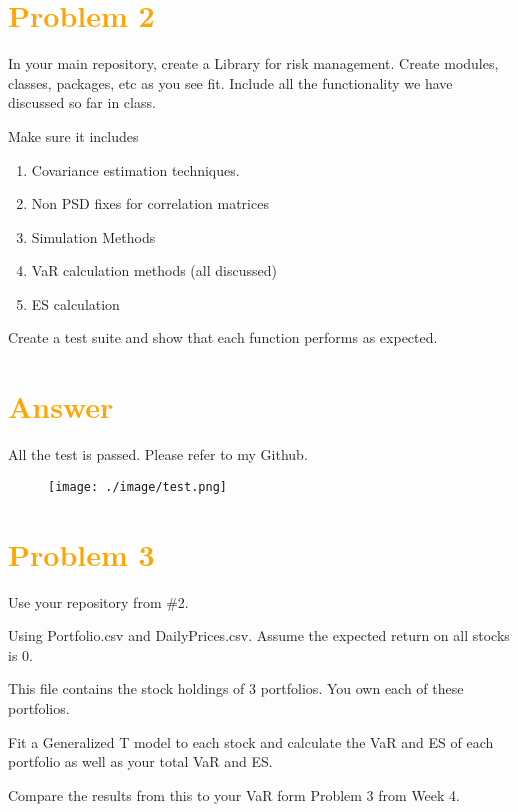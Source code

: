 \documentclass[11pt,en]{elegantpaper}
\begin{document}
\section*{\textcolor{orange}{Problem 2}}
    In your main repository, create a Library for risk management. Create modules, classes, packages, etc
    as you see fit. Include all the functionality we have discussed so far in class. 
    
    Make sure it includes
    \begin{enumerate}
        \item Covariance estimation techniques.
        \item Non PSD fixes for correlation matrices
        \item Simulation Methods
        \item VaR calculation methods (all discussed)
        \item ES calculation
    \end{enumerate}

    Create a test suite and show that each function performs as expected.
    


\section*{\textcolor{orange}{Answer}}
    
    All the test is passed. Please refer to my Github.

    \begin{figure}[htbp] 
        \centering 
        \texttt{[image: ./image/test.png]} 
    \end{figure}

\section*{\textcolor{orange}{Problem 3}}
    Use your repository from \#2.

    Using Portfolio.csv and DailyPrices.csv. Assume the expected return on all stocks is 0.

    This file contains the stock holdings of 3 portfolios. You own each of these portfolios.

    Fit a Generalized T model to each stock and calculate the VaR and ES of each portfolio as well as your
    total VaR and ES. 
    
    Compare the results from this to your VaR form Problem 3 from Week 4.
\end{document}

